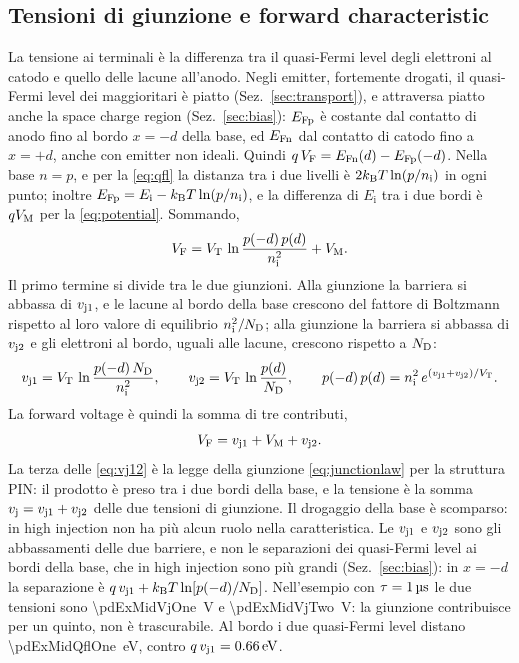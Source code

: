 \documentclass[10pt,a4paper]{scrartcl}
\let\newcommand\pdvaluedefine
\newcommand{\VF}{V_\mathrm{F}}
\newcommand{\vj}{v_\mathrm{j}}
\newcommand{\vjo}{v_\mathrm{j1}}
\newcommand{\vjt}{v_\mathrm{j2}}
\newcommand{\VT}{V_\mathrm{T}}
\newcommand{\ND}{N_\mathrm{D}}
\newcommand{\nint}{n_\mathrm{i}}
\newcommand{\VM}{V_\mathrm{M}}
\newcommand{\kB}{k_\mathrm{B}}
\newcommand{\EFn}{E_\mathrm{Fn}}
\newcommand{\EFp}{E_\mathrm{Fp}}
\newcommand{\Pp}{p\textsuperscript{+}}
\newcommand{\Nm}{n\textsuperscript{--}}
\newcommand{\Np}{n\textsuperscript{+}}
\begin{document}
\subsection{Tensioni di giunzione e forward characteristic}
\label{sec:vf}
La tensione ai terminali è la differenza tra il quasi-Fermi level degli elettroni al catodo e quello delle lacune all'anodo. Negli emitter, fortemente drogati, il quasi-Fermi level dei maggioritari è piatto (Sez.~\ref{sec:transport}), e attraversa piatto anche la space charge region (Sez.~\ref{sec:bias}): $\EFp$ è costante dal contatto di anodo fino al bordo $x = -d$ della base, ed $\EFn$ dal contatto di catodo fino a $x = +d$, anche con emitter non ideali. Quindi $q\,\VF = \EFn(d) - \EFp(-d)$. Nella base $n = p$, e per la \eqref{eq:qfl} la distanza tra i due livelli è $2\kB T\ln(p/\nint)$ in ogni punto; inoltre $\EFp = E_\mathrm{i} - \kB T\ln(p/\nint)$, e la differenza di $E_\mathrm{i}$ tra i due bordi è $q\VM$ per la \eqref{eq:potential}. Sommando,
\begin{equation}
\VF = \VT\,\ln\frac{p(-d)\,p(d)}{\nint^2} + \VM .
\label{eq:vfqfl}
\end{equation}
Il primo termine si divide tra le due giunzioni. Alla giunzione \Pp\Nm{} la barriera si abbassa di $\vjo$, e le lacune al bordo della base crescono del fattore di Boltzmann rispetto al loro valore di equilibrio $\nint^2/\ND$; alla giunzione \Nm\Np{} la barriera si abbassa di $\vjt$ e gli elettroni al bordo, uguali alle lacune, crescono rispetto a $\ND$:
\begin{equation}
\vjo = \VT\,\ln\frac{p(-d)\,\ND}{\nint^2} , \qquad \vjt = \VT\,\ln\frac{p(d)}{\ND} , \qquad
p(-d)\,p(d) = \nint^2\,e^{(\vjo+\vjt)/\VT} .
\label{eq:vj12}
\end{equation}
La forward voltage è quindi la somma di tre contributi,
\begin{equation}
\VF = \vjo + \VM + \vjt .
\label{eq:vfsum}
\end{equation}
La terza delle \eqref{eq:vj12} è la legge della giunzione \eqref{eq:junctionlaw} per la struttura PIN: il prodotto è preso tra i due bordi della base, e la tensione è la somma $\vj = \vjo + \vjt$ delle due tensioni di giunzione. Il drogaggio della base è scomparso: in high injection non ha più alcun ruolo nella caratteristica. Le $\vjo$ e $\vjt$ sono gli abbassamenti delle due barriere, e non le separazioni dei quasi-Fermi level ai bordi della base, che in high injection sono più grandi (Sez.~\ref{sec:bias}): in $x = -d$ la separazione è $q\,\vjo + \kB T\ln[p(-d)/\ND]$. Nell'esempio con $\tau = \SI{1}{\micro\second}$ le due tensioni sono \SI{\pdExMidVjOne}{\volt} e \SI{\pdExMidVjTwo}{\volt}: la giunzione \Nm\Np{} contribuisce per un quinto, non è trascurabile. Al bordo \Pp{} i due quasi-Fermi level distano \SI{\pdExMidQflOne}{\electronvolt}, contro $q\,\vjo = \SI{\pdExMidVjOne}{\electronvolt}$.
\end{document}
